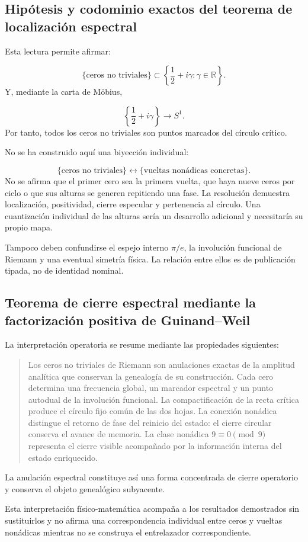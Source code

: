 \subsection{Hipótesis y codominio exactos del teorema de localización espectral}
Esta lectura permite afirmar:\par
\[
\{\text{ceros no triviales}\}
\subset
\left\{
\frac12+i\gamma:\gamma\in\mathbb R
\right\}.
\]
Y, mediante la carta de Möbius,\par
\[
\left\{
\frac12+i\gamma
\right\}
\longrightarrow
S^1.
\]
Por tanto, todos los ceros no triviales son puntos marcados del círculo crítico.\par
No se ha construido aquí una biyección individual:\par
\[
\{
\text{ceros no triviales}
\}
\longleftrightarrow
\{
\text{vueltas nonádicas concretas}
\}.
\]
No se afirma que el primer cero sea la primera vuelta, que haya nueve ceros por ciclo o que sus alturas se generen repitiendo una fase. La resolución demuestra localización, positividad, cierre especular y pertenencia al círculo. Una cuantización individual de las alturas sería un desarrollo adicional y necesitaría su propio mapa.\par
Tampoco deben confundirse el espejo interno \(\pi/e\), la involución funcional de Riemann y una eventual simetría física. La relación entre ellos es de publicación tipada, no de identidad nominal.\par
{}
\subsection{Teorema de cierre espectral mediante la factorización positiva de Guinand–Weil}
La interpretación operatoria se resume mediante las propiedades siguientes:\par
\begin{quote}
Los ceros no triviales de Riemann son anulaciones exactas de la amplitud analítica que conservan la genealogía de su construcción. Cada cero determina una frecuencia global, un marcador espectral y un punto autodual de la involución funcional. La compactificación de la recta crítica produce el círculo fijo común de las dos hojas. La conexión nonádica distingue el retorno de fase del reinicio del estado: el cierre circular conserva el avance de memoria. La clase nonádica \(9\equiv0\pmod 9\) representa el cierre visible acompañado por la información interna del estado enriquecido.\par
\end{quote}
La anulación espectral constituye así una forma concentrada de cierre operatorio y conserva el objeto genealógico subyacente.\par
Esta interpretación físico-matemática acompaña a los resultados demostrados sin sustituirlos y no afirma una correspondencia individual entre ceros y vueltas nonádicas mientras no se construya el entrelazador correspondiente.\par

